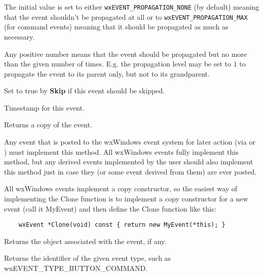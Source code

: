 The initial value is set to either {\tt wxEVENT\_PROPAGATION\_NONE} (by
default) meaning that the event shouldn't be propagated at all or to 
{\tt wxEVENT\_PROPAGATION\_MAX} (for command events) meaning that it should be
propagated as much as necessary.

Any positive number means that the event should be propagated but no more than
the given number of times. E.g. the propagation level may be set to $1$ to
propagate the event to its parent only, but not to its grandparent.



Set to true by {\bf Skip} if this event should be skipped.



Timestamp for this event.

\label{wxeventclone}


Returns a copy of the event.

Any event that is posted to the wxWindows event system for later action (via
 or
) must implement this method. All wxWindows
events fully implement this method, but any derived events implemented by the
user should also implement this method just in case they (or some event
derived from them) are ever posted.

All wxWindows events implement a copy constructor, so the easiest way of
implementing the Clone function is to implement a copy constructor for
a new event (call it MyEvent) and then define the Clone function like this:
\begin{verbatim}
    wxEvent *Clone(void) const { return new MyEvent(*this); }
\end{verbatim}



Returns the object associated with the
event, if any.



Returns the identifier of the given event type,
such as wxEVENT\_TYPE\_BUTTON\_COMMAND.

